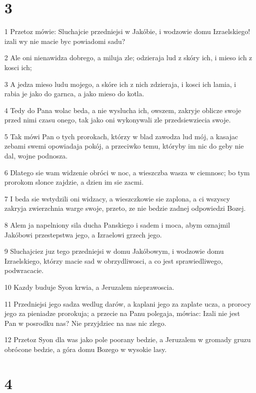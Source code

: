 \chapter{3}

\par 1 Przetoz mówie: Sluchajcie przedniejsi w Jakóbie, i wodzowie domu Izraelskiego! izali wy nie macie byc powiadomi sadu?
\par 2 Ale oni nienawidza dobrego, a miluja zle; odzieraja lud z skóry ich, i mieso ich z kosci ich;
\par 3 A jedza mieso ludu mojego, a skóre ich z nich zdzieraja, i kosci ich lamia, i rabia je jako do garnca, a jako mieso do kotla.
\par 4 Tedy do Pana wolac beda, a nie wyslucha ich, owszem, zakryje oblicze swoje przed nimi czasu onego, tak jako oni wykonywali zle przedsiewziecia swoje.
\par 5 Tak mówi Pan o tych prorokach, którzy w blad zawodza lud mój, a kasajac zebami swemi opowiadaja pokój, a przeciwko temu, któryby im nic do geby nie dal, wojne podnosza.
\par 6 Dlatego sie wam widzenie obróci w noc, a wieszczba wasza w ciemnosc; bo tym prorokom slonce zajdzie, a dzien im sie zacmi.
\par 7 I beda sie wstydzili oni widzacy, a wieszczkowie sie zaplona, a ci wszyscy zakryja zwierzchnia warge swoje, przeto, ze nie bedzie zadnej odpowiedzi Bozej.
\par 8 Alem ja napelniony sila ducha Panskiego i sadem i moca, abym oznajmil Jakóbowi przestepstwa jego, a Izraelowi grzech jego.
\par 9 Sluchajciez juz tego przedniejsi w domu Jakóbowym, i wodzowie domu Izraelskiego, którzy macie sad w obrzydliwosci, a co jest sprawiedliwego, podwracacie.
\par 10 Kazdy buduje Syon krwia, a Jeruzalem nieprawoscia.
\par 11 Przedniejsi jego sadza wedlug darów, a kaplani jego za zaplate ucza, a prorocy jego za pieniadze prorokuja; a przecie na Panu polegaja, mówiac: Izali nie jest Pan w posrodku nas? Nie przyjdziec na nas nic zlego.
\par 12 Przetoz Syon dla was jako pole poorany bedzie, a Jeruzalem w gromady gruzu obrócone bedzie, a góra domu Bozego w wysokie lasy.

\chapter{4}

